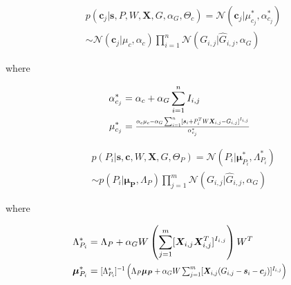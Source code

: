 \documentclass[10pt]{proc}
\begin{document}
\begin{mdframed}[style=eqbox]
\begin{equation} \label{cpd-c}
\begin{aligned}
    &p(\bm{c}_j | \bm{s}, P, W, \bm{X}, G, \alpha_G, \Theta_c)
        = \mathcal{N}(\bm{c}_j | \mu_{c_j}^*, \alpha_{c_j}^*) \\
        & \sim \mathcal{N}(\bm{c}_j | \mu_c, \alpha_c)
               \prod_{i=1}^n \mathcal{N}(G_{i,j} | \hat{G}_{i,j}, \alpha_G)
\end{aligned}
\end{equation}

where

\begin{align}
    \alpha_{c_j}^* &= \begin{aligned}[t]
        \alpha_c + \alpha_G \sum_{i=1}^n I_{i,j}
    \end{aligned}\\
%
    \mu_{c_j}^* &= \begin{aligned}[t]
        \hstretch{0.8}{\vstretch{0.9}{
            \frac{
                \alpha_c\mu_c -
                \alpha_G \sum_{i=1}^n
                    [\bm{s}_i + P_i^TW\bm{X}_{i,j} - G_{i,j} ]^{I_{i,j}}}
            {\alpha_{c_j}^*}}}
    \end{aligned}
\end{align}
\end{mdframed}


\begin{mdframed}[style=eqbox]
{\setlength{\mathindent}{0cm}
\begin{equation} \label{cpd-P}
\begin{aligned}
    &p(P_i | \bm{s}, \bm{c}, W, \bm{X}, G, \Theta_P) =
        \mathcal{N}(P_i | \bm{\mu}_{P_i}^*, \Lambda_{P_i}^*) \\
        & \sim p(P_i | \bm{\mu_P}, \Lambda_P)
            \prod_{j=1}^m \mathcal{N}(G_{i,j} | \hat{G}_{i,j}, \alpha_G)
\end{aligned}
\end{equation}

where

\begin{align}
    \Lambda_{P_i}^* &= \begin{aligned}[t]
        \Lambda_P +
        \alpha_G W \left(
            \sum_{j=1}^m [\bm{X}_{i,j} \bm{X}_{i,j}^T ]^{I_{i,j}}
        \right) W^T
    \end{aligned}\\
%
    \bm{\mu}_{P_i}^* &= \begin{aligned}[t]
        \vstretch{0.9}{\hstretch{0.8}{
            [\Lambda_{P_i}^*]^{-1} \left(
                \Lambda_P\bm{\mu_P} +
                \alpha_G W \sum_{j=1}^m
                    [\bm{X}_{i,j}(G_{i,j} - \bm{s}_i - \bm{c}_j)]^{I_{i,j}}
            \right)}}
        \end{aligned}
\end{align}}
\end{mdframed}
\end{document}
